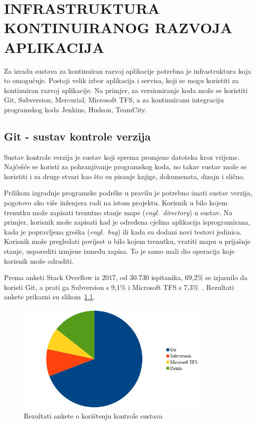 \chapter{INFRASTRUKTURA KONTINUIRANOG RAZVOJA APLIKACIJA}
Za izradu sustava za kontinuiran razvoj aplikacije potrebna je infrastruktura koja to omogućuje.
Postoji velik izbor aplikacija i servisa, koji se mogu koristiti za kontinuiran razvoj aplikacije.
Na primjer, za verzioniranje koda može se koristiti Git, Subversion, Mercurial, Microsoft TFS, a za
kontinuiranu integraciju programskog koda Jenkins, Hudson, TeamCity.

\section{Git - sustav kontrole verzija}
Sustav kontrole verzija je sustav koji sprema promjene datoteka kroz vrijeme. Najčešće se koristi za
pohranjivanje programskog koda, no takav sustav može se koristiti i za druge stvari kao što su
pisanje knjige, dokumenata, dizajn i slično.

Prilikom izgradnje programske podrške u pravilu je potrebno imati sustav verzija, pogotovo ako više
inženjera radi na istom projektu. Korisnik u bilo kojem trenutku može zapisati trenutno stanje mape
(\textit{engl.~directory}) u sustav. Na primjer, korisnik može zapisati kad je određena cjelina
aplikacija isprogramirana, kada je popravljena greška (\textit{engl.~bug}) ili kada su dodani novi
testovi jedinica. Korisnik može pregledati povijest u bilo kojem trenutku, vratiti mapu u prijašnje
stanje, usporediti izmjene između zapisa. To je samo mali dio operacija koje korisnik može odraditi.

Prema anketi Stack Overflow iz 2017, od 30.730 ispitanika, 69,2\% se izjasnilo da koristi
Git, a prati ga Subversion s 9,1\% i Microsoft TFS s 7,3\%~\citep{StackOverflow2017Survey}.
Rezultati ankete prikazni su slikom~\ref{fig:02so_survey}.

\begin{figure}[h]
    \centering
    \includegraphics[width=0.85\textwidth]{img/02/so_survey.png}
    \caption{Rezultati ankete o korištenju kontrole sustava}%
    \label{fig:02so_survey}
\end{figure}


